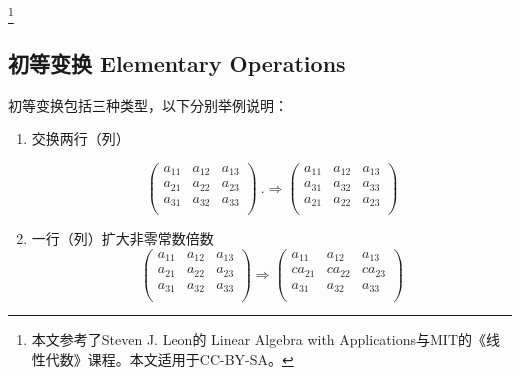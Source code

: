 
\begin{issues}
\issueMissDepend
\end{issues}

\footnote{本文参考了Steven J. Leon的 Linear Algebra with Applications与MIT的《线性代数》课程。本文适用于CC-BY-SA。}

\subsection{初等变换 Elementary Operations}
初等变换包括三种类型，以下分别举例说明：

\begin{enumerate}
\item 交换两行（列）

\begin{equation}
\begin{pmatrix}
        a_{11} & a_{12} & a_{13}\\
        a_{21} & a_{22} & a_{23}\\
        a_{31} & a_{32} & a_{33}\\
\end{pmatrix}~.
\Rightarrow
\begin{pmatrix}
        a_{11} & a_{12} & a_{13}\\
        a_{31} & a_{32} & a_{33}\\
        a_{21} & a_{22} & a_{23}\\
\end{pmatrix}
\end{equation}

\item 一行（列）扩大非零常数倍数
\begin{equation}
\begin{pmatrix}
        a_{11} & a_{12} & a_{13}\\
        a_{21} & a_{22} & a_{23}\\
        a_{31} & a_{32} & a_{33}\\
\end{pmatrix}
\Rightarrow
\begin{pmatrix}
        a_{11} & a_{12} & a_{13}\\
        ca_{21} & ca_{22} & ca_{23}\\
        a_{31} & a_{32} & a_{33}\\
\end{pmatrix}
\end{equation}


\end{enumerate}
